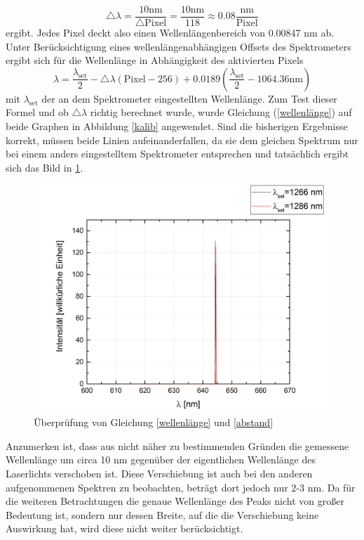 \begin{equation}
\triangle\lambda=\frac{10\text{nm}}{\triangle\text{Pixel}}=\frac{10\text{nm}}{118}\approx0.08 \frac{\text{nm}}{\text{Pixel}}
\label{abstand}
\end{equation}
ergibt. Jedes Pixel deckt also einen Wellenlängenbereich von 0.00847 nm ab. Unter Berücksichtigung eines wellenlängenabhängigen Offsets des Spektrometers ergibt sich für die Wellenlänge in Abhängigkeit des aktivierten Pixels
\begin{equation}
\lambda=\frac{\lambda_{\text{set}}}{2}-\triangle\lambda(\text{Pixel}-256)+0.0189\left(\frac{\lambda_{\text{set}}}{2}-1064.36\text{nm}\right)
\label{wellenlänge}
\end{equation}
mit $\lambda_{\text{set}}$ der an dem Spektrometer eingestellten Wellenlänge. Zum Test dieser Formel und ob $\triangle\lambda$ richtig berechnet wurde, wurde Gleichung (\ref{wellenlänge}) auf beide Graphen in Abbildung \ref{kalib} angewendet. Sind die bisherigen Ergebnisse korrekt, müssen beide Linien aufeinanderfallen, da sie dem gleichen Spektrum nur bei einem anders eingestelltem Spektrometer entsprechen und tatsächlich ergibt sich das Bild in \ref{test}.
\begin{figure}[H]
	\begin{center}
		\includegraphics[scale=.5]{Bilder/Test.png}
		\caption{Überprüfung von Gleichung \ref{wellenlänge} und \ref{abstand}}
		\label{test}
	\end{center}
\end{figure}
Anzumerken ist, dass aus nicht näher zu bestimmenden Gründen die gemessene Wellenlänge um circa 10 nm gegenüber der eigentlichen Wellenlänge des Laserlichts verschoben ist. Diese Verschiebung ist auch bei den anderen aufgenommenen Spektren zu beobachten, beträgt dort jedoch nur 2-3 nm. Da für die weiteren Betrachtungen die genaue Wellenlänge des Peaks nicht von großer Bedeutung ist, sondern nur dessen Breite, auf die die Verschiebung keine Auswirkung hat, wird diese nicht weiter berücksichtigt.\newline
